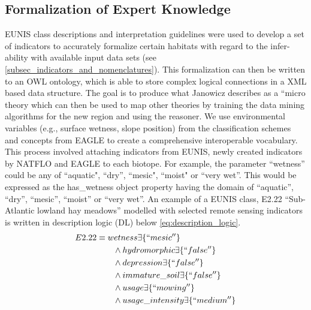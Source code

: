 \documentclass[authoryear, review,12pt,number]{elsarticle}
\begin{document}
\subsection{Formalization of Expert Knowledge}
EUNIS class descriptions and interpretation guidelines \citep{EUNISManual} were
used to develop a set of indicators to accurately formalize certain habitats
with regard to the infer-ability with available input data sets (see
\ref{subsec_indicators_and_nomenclatures}). This formalization can then be
written to an OWL ontology, which is able to store complex logical connections
in a XML based data structure. The goal is to produce what Janowicz describes
as a ``micro theory \citep{Janowicz2012} which can then be used to map other
theories by training the data mining algorithms for the new
region and using the reasoner. We use environmental variables (e.g., surface
wetness, slope position) from the classification schemes and concepts from
EAGLE to create a comprehensive interoperable vocabulary. This process involved
attaching indicators from EUNIS, newly created indicators by NATFLO and EAGLE
to each biotope. For example, the parameter ``wetness'' could be any of
``aquatic", ``dry'', ``mesic", ``moist" or ``very wet''. This would be expressed
as the has\_wetness object property having the domain of ``aquatic'', ``dry'',
``mesic'', ``moist'' or ``very wet''. An example of a EUNIS class, E2.22
``Sub-Atlantic lowland hay meadows'' modelled with selected remote sensing
indicators is written in description logic (DL) below
\ref{eq:description_logic}.
\begin{equation}
\begin{align*}
E2.22 &\equiv wetness \exists \{``mesic''\} \\
&\qquad {} \land hydromorphic \exists \{``false''\} \\
&\qquad {} \land depression \exists \{``false''\} \\
&\qquad {} \land immature\_soil \exists \{``false''\} \\
&\qquad {} \land usage \exists \{``mowing''\} \\
&\qquad {} \land usage\_intensity \exists \{``medium''\} \\
\end{align*}
\label{eq:description_logic}
\end{equation}
\end{document}
